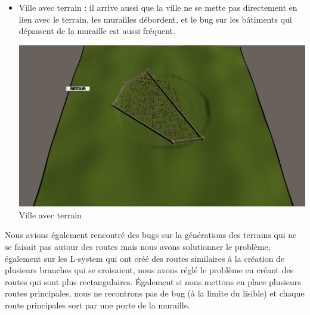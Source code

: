 \begin{itemize}
	\item Ville avec terrain : il arrive aussi que la ville ne se mette pas directement en lien avec le terrain, les murailles débordent, et le bug sur les bâtiments qui dépassent de la muraille est aussi fréquent. 
	
	
\begin{center}
	\centering
    \includegraphics[height = 5 cm]{images/testville3.png}\\
	\small{Ville avec terrain}
\end{center}
	
\end{itemize}

Nous avions également rencontré des bugs sur la générations des terrains qui ne se faisait pas autour des routes mais nous avons solutionner le problème, également sur les L-system qui ont créé des routes similaires à la création de plusieurs branches qui se croisaient, nous avons réglé le problème en créant des routes qui sont plus rectangulaires. Également si nous mettons en place plusieurs routes principales, nous ne recontrons pas de bug (à la limite du lisible) et chaque route principales sort par une porte de la muraille.